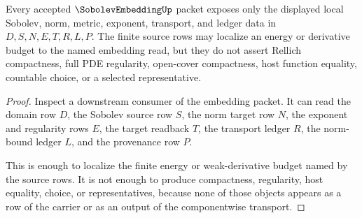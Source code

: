 \begin{theorem}
\label{thm:sobolev-embedding-finite-energy-localization}
Every accepted $\SobolevEmbeddingUp$ packet exposes only the displayed local Sobolev, norm, metric, exponent, transport, and ledger data in $D,S,N,E,T,R,L,P$. The finite source rows may localize an energy or derivative budget to the named embedding read, but they do not assert Rellich compactness, full PDE regularity, open-cover compactness, host function equality, countable choice, or a selected representative.
\end{theorem}
\begin{proof}
Inspect a downstream consumer of the embedding packet. It can read the domain row $D$, the Sobolev source row $S$, the norm target row $N$, the exponent and regularity rows $E$, the target readback $T$, the transport ledger $R$, the norm-bound ledger $L$, and the provenance row $P$.

This is enough to localize the finite energy or weak-derivative budget named by the source rows. It is not enough to produce compactness, regularity, host equality, choice, or representatives, because none of those objects appears as a row of the carrier or as an output of the componentwise transport.
\end{proof}


\begin{closurestatus}{\SobolevEmbeddingUp}
  \theoryclosure{\seedClosure}
  \formalstatus{\unformalizedV}
\end{closurestatus}
